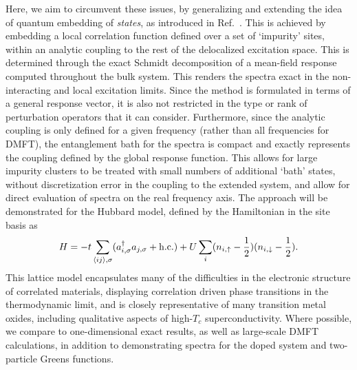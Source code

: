 \documentclass[aps,showpacs,twocolumn,nobibnotes]{revtex4}
\begin{document}
Here, we aim to circumvent these issues, by generalizing and extending the idea of quantum embedding of {\em states}, as introduced in 
Ref.~. This is achieved by embedding a local correlation function defined over a set of `impurity' sites, within an 
analytic coupling to the rest of the delocalized excitation space. This is determined through the exact Schmidt decomposition of a mean-field 
response computed throughout the bulk system. This renders the spectra exact in the non-interacting and local excitation limits. 
Since the method is formulated in terms of a general response vector, it is also not restricted in the type or rank of perturbation 
operators that it can consider. Furthermore, since the analytic coupling is only defined for a given frequency (rather than all frequencies 
for DMFT), the entanglement bath for the spectra is compact and exactly represents the coupling defined by the global response function. This 
allows for large impurity clusters to be treated with small numbers of additional `bath' states, without discretization error in the coupling 
to the extended system, and allow for direct evaluation of spectra on the real frequency axis. The approach will be demonstrated for the Hubbard model, 
defined by the Hamiltonian in the site basis as
\begin{equation}
H = -t \sum_{\langle ij \rangle, \sigma} (a_{i,\sigma}^{\dagger}a_{j,\sigma} + \text{\textnormal {h.c.}}) + U \sum_i (n_{i,\uparrow} - \frac{1}{2})(n_{i,\downarrow} - \frac{1}{2})  . \label{eqn:hub}
\end{equation}
This lattice model encapsulates many of the difficulties in the electronic structure of correlated materials, displaying correlation driven 
phase transitions in the thermodynamic limit, and is closely representative of many transition metal oxides\cite{Limelette2003}, including qualitative aspects 
of high-$T_c$ superconductivity\cite{Anderson87,Sordi2012,Millis2013}. Where possible, we compare to one-dimensional exact results\cite{Lieb68,Ovchinni1970}, as 
well as large-scale DMFT calculations\cite{Go2009,Kotliar2008}, in addition to demonstrating spectra for the doped system and two-particle Greens functions.
\end{document}
